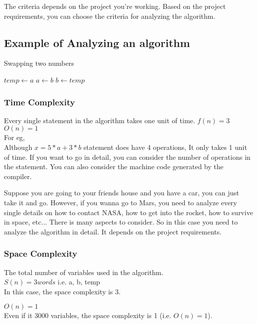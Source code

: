 \documentclass[twocolumn]{article}
\begin{document}
The criteria depends on the project you're working. Based on the project requirements, you can choose the criteria for analyzing the algorithm.

\subsection{Example of Analyzing an algorithm}
\noindent
\begin{algorithm}
\caption{Swapping two numbers}\label{analyze_swap}
\begin{algorithmic}
\State $temp \gets a$ 
\State $a \gets b$ 
\State $b \gets temp$ 
\EndProcedure
\end{algorithmic}
\end{algorithm}

\subsubsection{Time Complexity}
Every single statement in the algorithm takes one unit of time.
$f(n) = 3$ \\
$O(n) = 1$ \\
\break
\noindent
For eg, \\
Although $x = 5*a + 3*b$ statement does have 4 operations, It only takes 1 unit of time. 
If you want to go in detail, you can consider the number of operations in the statement. You can also consider the machine code generated by the compiler.

\noindent
Suppose you are going to your friends house and you have a car, you can just take it and go. However, if you wanna go to Mars, you need to analyze every single details on how to contact NASA, how to get into the rocket, how to survive in space, etc... There is many aspects to consider. So in this case you need to analyze the algorithm in detail. It depends on the project requirements.

\subsubsection{Space Complexity}
The total number of variables used in the algorithm. \\
$S(n) = 3 words$  i.e. a, b, temp\\ 
In this case, the space complexity is 3.

$O(n) = 1$ \\ 
Even if it 3000 variables, the space complexity is 1 (i.e. $O(n) = 1$).
\\
\end{document}
